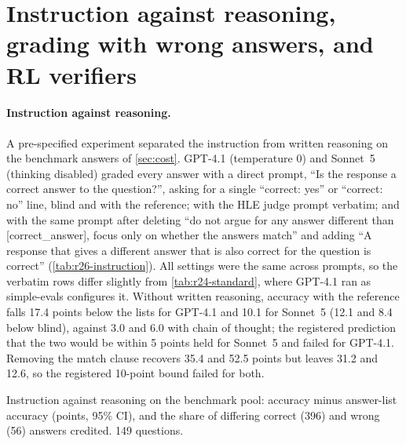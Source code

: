 \FloatBarrier
\section{Instruction against reasoning, grading with wrong answers, and RL verifiers}
\label{app:r26}

\paragraph{Instruction against reasoning.} A pre-specified experiment separated the instruction from written reasoning on the benchmark answers of \cref{sec:cost}. GPT-4.1 (temperature 0) and Sonnet~5 (thinking disabled) graded every answer with a direct prompt, ``Is the response a correct answer to the question?'', asking for a single ``correct: yes'' or ``correct: no'' line, blind and with the reference; with the HLE judge prompt verbatim; and with the same prompt after deleting ``do not argue for any answer different than [correct\_answer], focus only on whether the answers match'' and adding ``A response that gives a different answer that is also correct for the question is correct'' (\cref{tab:r26-instruction}). All settings were the same across prompts, so the verbatim rows differ slightly from \cref{tab:r24-standard}, where GPT-4.1 ran as simple-evals configures it. Without written reasoning, accuracy with the reference falls 17.4 points below the lists for GPT-4.1 and 10.1 for Sonnet~5 (12.1 and 8.4 below blind), against 3.0 and 6.0 with chain of thought; the registered prediction that the two would be within 5 points held for Sonnet~5 and failed for GPT-4.1. Removing the match clause recovers 35.4 and 52.5 points but leaves 31.2 and 12.6, so the registered 10-point bound failed for both.

\begin{table}[htbp]
\centering
\caption{Instruction against reasoning on the benchmark pool: accuracy minus answer-list accuracy (points, 95\% CI), and the share of differing correct (396) and wrong (56) answers credited. 149 questions.\pre}
\label{tab:r26-instruction}
\footnotesize
\setlength{\tabcolsep}{3pt}
\begin{adjustbox}{max width=\linewidth}\end{adjustbox}
\end{table}


